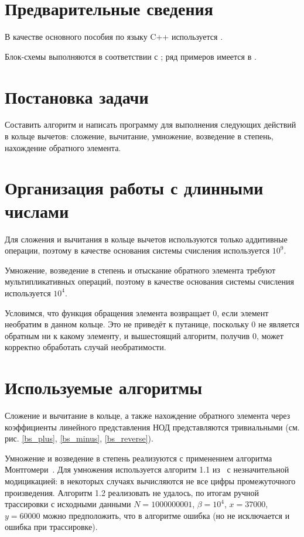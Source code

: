 \documentclass[a4paper,12pt]{article} %
\begin{document}
\setcounter{page}{2}

\section*{Предварительные сведения}

В качестве основного пособия по языку C++ используется \cite{chmyhalo}.


Блок-схемы выполняются в соответствии с \cite{gost-block-scheme};
ряд примеров имеется в \cite{wiki-block-scheme}.


\section*{Постановка задачи}
Составить алгоритм и написать программу
для выполнения следующих действий в кольце вычетов:
сложение, вычитание, умножение, возведение в степень,
нахождение обратного элемента.


\section*{Организация работы с длинными числами}
Для сложения и вычитания в кольце вычетов используются только аддитивные операции,
поэтому в качестве основания системы счисления используется $10^9$.

Умножение, возведение в степень и отыскание обратного элемента требуют
мультипликативных операций,
поэтому в качестве основания системы счисления используется $10^4$.

Условимся, что функция обращения элемента возвращает 0,
если элемент необратим в данном кольце.
Это не приведёт к путанице, поскольку 0 не является обратным ни к какому элементу,
и вышестоящий алгоритм, получив 0, может корректно обработать случай необратимости.

\section*{Используемые алгоритмы}

Сложение и вычитание в кольце,
а также нахождение обратного элемента через коэффициенты линейного представления НОД
представляются тривиальными (см. рис. \ref{bs_plus}, \ref{bs_minus}, \ref{bs_reverse}).

Умножение и возведение в степень реализуются с применением алгоритма Монтгомери~\cite{Glukhov}.
Для умножения используется алгоритм 1.1 из~\cite{Glukhov} с незначительной модицикацией:
в некоторых случаях вычисляются не все цифры промежуточного произведения.
Алгоритм 1.2 реализовать не удалось, по итогам ручной трассировки с исходными данными
$N=1000000001$, $\beta=10^4$, $x=37000$, $y=60000$ можно предположить,
что в алгоритме ошибка (но не исключается и ошибка при трассировке).
\end{document}
